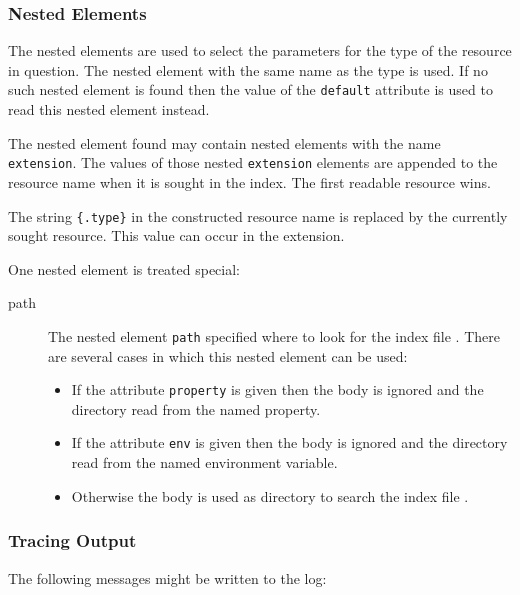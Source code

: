 \subsubsection*{Nested Elements}

The nested elements are used to select the parameters for the type of
the resource in question. The nested element with the same name as the
type is used. If no such nested element is found then the value of the
\texttt{default} attribute is used to read this nested element
instead. 

The nested element found may contain nested elements with the name
\texttt{extension}. The values of those nested \texttt{extension}
elements are appended to the resource name when it is sought in the
index. The first readable resource wins.

The string \verb|{.type}| in the constructed resource name is replaced
by the currently sought resource. This value can occur in the
extension.

One nested element is treated special:

\begin{description}
\item[path] The nested element \texttt{path} specified where to look
  for the index file . There are several cases in which
  this nested element can be used:
  \begin{itemize}
  \item If the attribute \texttt{property} is given then the body is
    ignored and the directory read from the named property.
  \item If the attribute \texttt{env} is given then the body is
    ignored and the directory read from the named environment
    variable.
  \item Otherwise the body is used as directory to search the index
    file .
  \end{itemize}
\end{description}

\subsubsection*{Tracing Output}

The following messages might be written to the log:

